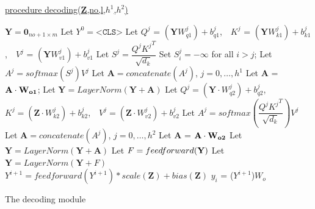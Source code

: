 \documentclass[algorithms,article,submit,pdftex,moreauthors]{Definitions/mdpi}
\begin{document}
\begin{algorithm2e} 

        \underline{procedure decoding({\bf Z},no,l,$h^1$,$h^2$)} 
        
        
        \label{dec:start}
        $\textbf{Y} = \textbf{0}_{no + 1 \times m}$ \; 	\label{dec:output}
        Let $Y^0 = \texttt{<CLS>}$ \;					\label{dec:cls}
	{       \label{dec:outer}
            {	\label{dec:decblock1}
                {   \label{dec:self1}
                    Let $Q^j$ = $(\textbf{Y}W_{q1}^j) + b_{q1}^j$,  \,\, 
                            $K^j$ = $(\textbf{Y}W_{k1}^j) + b_{k1}^j$,  \,\, 
                            $V^j$ = $(\textbf{Y}W_{v1}^j) + b_{v1}^j$   \;
                            \label{dec:selfproj}
                    Let $S^j = \dfrac{Q^j{K^j}^T}{\sqrt{d_k}}$\; \label{dec:scaled1}
                    Set $S_i^j=-\infty$ for all $i>j$; 
                    \label{dec:masking}
                    Let $A^j = softmax\left(S^j\right)V^j$
                    \label{dec:softmax}
                }   \label{dec:self2}
                Let $\textbf{A}=concatenate(A^j)$, $j=0,\dots,h^1$\; \label{dec:concatenation1}
                Let {\bf A} = ${\bf A \cdot W_{o1}}$;  \label{dec:outproject1}
                Let $\textbf{Y} = LayerNorm(\textbf{Y} + \textbf{A})$\; \label{dec:norm1}
                {   \label{dec:cross1}
                    Let $Q^j=(\textbf{Y}\cdot W_{q2}^j) + b_{q2}^j$, \,\,
                            $K^j=(\textbf{Z}\cdot W_{k2}^j) + b_{k2}^j$, \,\, 
                            $V^j=(\textbf{Z}\cdot W_{v2}^j) + b_{v2}^j$\;
                    \label{dec:crossproj}
                    Let $A^{j} = softmax\left(\dfrac{Q^j{K^j}^T}{\sqrt{d_k}}\right)V^j$\;
                    \label{dec:scaled2}
                }   \label{dec:cross2}
                Let $\textbf{A}=concatenate(A^j)$, $j=0,\dots,h^2$\;
                \label{dec:concatenation2}
                Let {\bf A} = ${\bf A \cdot W_{o2}}$\;
                \label{dec:outproject2}
                Let $\textbf{Y} = LayerNorm(\textbf{Y} + \textbf{A})$\;
                \label{dec:norm2}
                Let $F = feedforward({\bf Y})$\;
                \label{dec:ffn}
                Let $\textbf{Y} = LayerNorm(\textbf{Y} + F)$\;
                \label{dec:norm3}
            } \label{dec:decblock2}
            $Y^{i + 1} = feedforward(Y^{i + 1})  * scale(\textbf{Z}) + bias(\textbf{Z})$\; \label{dec:finalproj}
            $y_i$ = ($Y^{i + 1}$)$W_o$
        } \label{dec:outer2}                     
    	\caption{The decoding module} 
    \label{algo:decoding}
\end{algorithm2e}
\end{document}
